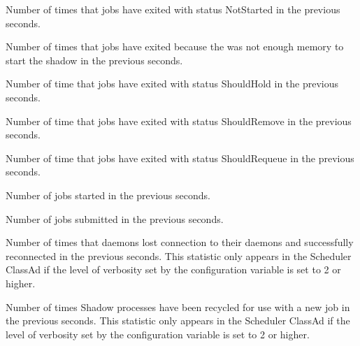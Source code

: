 \begin{description}
\item[\AdAttr{RecentJobsNotStarted}:] Number of times that jobs have exited with status NotStarted
  in the previous  seconds.

\item[\AdAttr{RecentJobsShadowNoMemory}:] Number of times that jobs have exited because the was not enough memory to start the shadow
  in the previous  seconds.

\item[\AdAttr{RecentJobsShouldHold}:] Number of time that jobs have exited with status ShouldHold
  in the previous  seconds.

\item[\AdAttr{RecentJobsShouldRemove}:] Number of time that jobs have exited with status ShouldRemove
  in the previous  seconds.

\item[\AdAttr{RecentJobsShouldRequeue}:] Number of time that jobs have exited with status ShouldRequeue
  in the previous  seconds.

\item[\AdAttr{RecentJobsStarted}:] Number of jobs started
  in the previous  seconds.

\item[\AdAttr{RecentJobsSubmitted}:] Number of jobs submitted
  in the previous  seconds.

\item[\AdAttr{RecentShadowsReconnections}:] Number of times that   daemons lost 
  connection to their  daemons and successfully reconnected
  in the previous  seconds.
  This statistic only appears in the Scheduler ClassAd if the level of
  verbosity set by the configuration variable 
  is set to 2 or higher.
  
\item[\AdAttr{RecentShadowsRecycled}:] Number of times Shadow processes have been 
  recycled for use with a new job
  in the previous  seconds.
  This statistic only appears in the Scheduler ClassAd if the level of
  verbosity set by the configuration variable 
  is set to 2 or higher.


\end{description}
